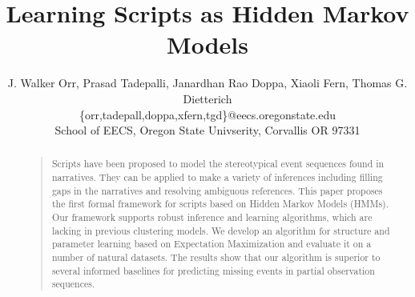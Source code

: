 \documentclass[letterpaper]{article}
\begin{document}
%
\title{Learning Scripts as Hidden Markov Models}
\author{J. Walker Orr, Prasad Tadepalli, Janardhan Rao Doppa, Xiaoli Fern, Thomas G. Dietterich \\ \{orr,tadepall,doppa,xfern,tgd\}@eecs.oregonstate.edu \\School of EECS, Oregon State Univserity, Corvallis OR 97331}
\maketitle
\begin{abstract}
\begin{quote}
Scripts have been proposed to model the stereotypical event sequences found in
narratives. They can be applied to make a variety of inferences including filling
gaps in the narratives and resolving ambiguous references. This paper proposes
the first formal framework for scripts based on Hidden Markov Models (HMMs). Our
framework supports robust inference and learning algorithms, which are lacking in
previous clustering models. We develop an algorithm for structure and parameter
learning based on Expectation Maximization and evaluate it on a number of natural
datasets. The results show that our algorithm is superior to
several informed baselines for predicting missing
events in partial observation sequences.
%

\end{quote}
\end{abstract}
\end{document}
